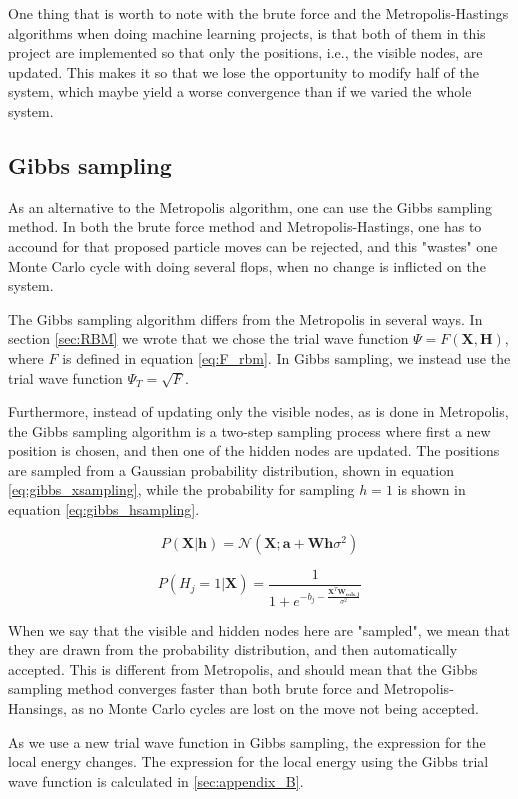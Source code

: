 \documentclass[norsk,a4paper,12pt]{article}
\begin{document}
One thing that is worth to note with the brute force and the Metropolis-Hastings algorithms when doing machine learning projects, is that both of them in this project are implemented so that only the positions, i.e., the visible nodes, are updated. This makes it so that we lose the opportunity to modify half of the system, which maybe yield a worse convergence than if we varied the whole system.


\subsection{Gibbs sampling}
As an alternative to the Metropolis algorithm, one can use the Gibbs sampling method. In both the brute force method and Metropolis-Hastings, one has to accound for that proposed particle moves can be rejected, and this "wastes" one Monte Carlo cycle with doing several flops, when no change is inflicted on the system. \par 
\vspace{3mm}
The Gibbs sampling algorithm differs from the Metropolis in several ways. In section \ref{sec:RBM} we wrote that we chose the trial wave function $\Psi = F(\boldsymbol{X},\boldsymbol{H})$, where $F$ is defined in equation \ref{eq:F_rbm}. In Gibbs sampling, we instead use the trial wave function $\Psi_T = \sqrt{F}$. 
\par 
\vspace{3mm}
Furthermore, instead of updating only the visible nodes, as is done in Metropolis, the Gibbs sampling algorithm is a two-step sampling process where first a new position is chosen, and then one of the hidden nodes are updated. The positions are sampled from a Gaussian probability distribution, shown in equation \ref{eq:gibbs_xsampling}, while the probability for sampling $h=1$ is shown in equation \ref{eq:gibbs_hsampling}.

\begin{equation}
\label{eq:gibbs_xsampling}
P(\boldsymbol{X} | \boldsymbol{h}) = \mathcal{N}(\boldsymbol{X}; \boldsymbol{a} + \boldsymbol{W} \boldsymbol{h} \sigma^2)
\end{equation}

\begin{equation}
\label{eq:gibbs_hsampling}
P(H_j = 1 | \boldsymbol{X}) = \frac{1}{ 1 + e^{- b_j - \frac{\boldsymbol{X}^T \boldsymbol{W_{cols,j}} }{\sigma^2}}}
\end{equation}

When we say that the visible and hidden nodes here are "sampled", we mean that they are drawn from the probability distribution, and then automatically accepted. This is different from Metropolis, and should mean that the Gibbs sampling method converges faster than both brute force and Metropolis-Hansings, as no Monte Carlo cycles are lost on the move not being accepted. \par 
\vspace{3mm}
As we use a new trial wave function in Gibbs sampling, the expression for the local energy changes. The expression for the local energy using the Gibbs trial wave function is calculated in \ref{sec:appendix_B}.
\end{document}
